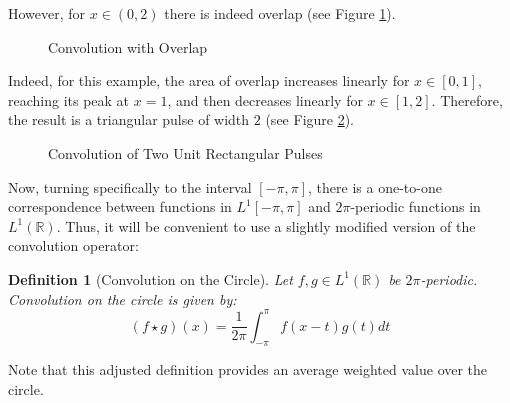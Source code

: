 \documentclass[letterpaper,12pt,fleqn,reqno]{amsart}
\theoremstyle{plain}
\newtheorem{definition}[theorem]{Definition}
\newcommand{\R}{\mathbb{R}}
\newcommand{\Lop}{L^1[-\pi,\pi]}
\newcommand{\Lor}{L^1(\R)}
\begin{document}
However, for $x\in(0,2)$ there is indeed overlap
(see Figure \ref{fig:conv:over}).

\begin{figure}[ht]
  \caption{Convolution with Overlap}
  \label{fig:conv:over}
\end{figure}

Indeed, for this example, the area of overlap increases linearly for
$x\in[0,1]$, reaching its peak at $x=1$, and then decreases linearly for
$x\in[1,2]$. Therefore, the result is a triangular pulse of width $2$
(see Figure \ref{fig:conv:result}).

\begin{figure}[ht]
  \caption{Convolution of Two Unit Rectangular Pulses}
  \label{fig:conv:result}
\end{figure}

Now, turning specifically to the interval $[-\pi,\pi]$, there is a one-to-one
correspondence between functions in $\Lop$ and $2\pi$-periodic functions in
$\Lor$. Thus, it will be convenient to use a slightly modified version of the
convolution operator:
\begin{definition}[Convolution on the Circle]
  Let $f,g\in\Lor$ be $2\pi$-periodic. Convolution on the circle is given by:
  \[(f\star g)(x)=\frac{1}{2\pi}\int_{-\pi}^{\pi}f(x-t)g(t)dt\]
\end{definition}
Note that this adjusted definition provides an average weighted value over
the circle.
\end{document}
